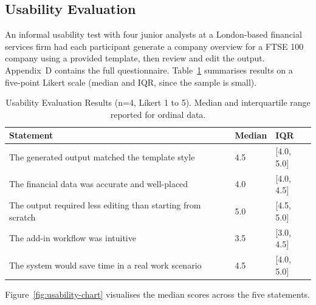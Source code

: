 \subsection{Usability Evaluation}

An informal usability test with four junior analysts at a London-based financial services firm had each participant generate a company overview for a FTSE 100 company using a provided template, then review and edit the output. Appendix~D contains the full questionnaire. Table~\ref{tab:usability-results} summarises results on a five-point Likert scale (median and IQR, since the sample is small).

\begin{table}[H]
\centering
\begin{tabular}{|l|l|l|}
\hline
\rowcolor{gray!20} \textbf{Statement} & \textbf{Median} & \textbf{IQR} \\
\hline
The generated output matched the template style & 4.5 & [4.0, 5.0] \\
\hline
The financial data was accurate and well-placed & 4.0 & [4.0, 4.5] \\
\hline
The output required less editing than starting from scratch & 5.0 & [4.5, 5.0] \\
\hline
The add-in workflow was intuitive & 3.5 & [3.0, 4.5] \\
\hline
The system would save time in a real work scenario & 4.5 & [4.0, 5.0] \\
\hline
\end{tabular}
\caption{Usability Evaluation Results (n=4, Likert 1 to 5). Median and interquartile range reported for ordinal data.}
\label{tab:usability-results}
\end{table}

Figure~\ref{fig:usability-chart} visualises the median scores across the five statements.

